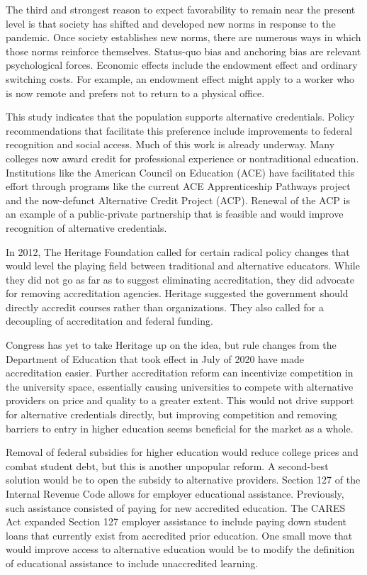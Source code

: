 The third and strongest reason to expect favorability to remain near the present level is that
society has shifted and developed new norms in response to the pandemic.
Once society establishes new norms, there are numerous ways in which those norms reinforce themselves.
Status-quo bias and anchoring bias are relevant psychological forces.
Economic effects include the endowment effect and ordinary switching costs.
For example, an endowment effect might apply to a worker who is now remote and prefers not to return to a physical office.

This study indicates that the population supports alternative credentials.
Policy recommendations that facilitate this preference include improvements to federal recognition and social access.
Much of this work is already underway.
Many colleges now award credit for professional experience or nontraditional education.
Institutions like the American Council on Education (ACE)
have facilitated this effort through programs like the current ACE Apprenticeship Pathways project
and the now-defunct Alternative Credit Project (ACP)\cite{education_2021}.
Renewal of the ACP is an example of a public-private partnership that is feasible and would improve recognition of alternative credentials.

In 2012, The Heritage Foundation called for certain radical policy changes that would level the playing field between traditional and alternative educators.
While they did not go as far as to suggest eliminating accreditation,
they did advocate for removing accreditation agencies.
Heritage suggested the government should directly accredit courses rather than organizations\cite{burke2012accreditation}.
They also called for a decoupling of accreditation and federal funding.

Congress has yet to take Heritage up on the idea,
but rule changes from the Department of Education that took effect in July of 2020
have made accreditation easier\cite{weissman_2019}.
Further accreditation reform can incentivize competition in the university space,
essentially causing universities to compete with alternative providers on price and quality to a greater extent.
This would not drive support for alternative credentials directly,
but improving competition and removing barriers to entry in higher education seems beneficial for the market as a whole.

Removal of federal subsidies for higher education would reduce college prices and combat student debt,
but this is another unpopular reform.
A second-best solution would be to open the subsidy to alternative providers.
Section 127 of the Internal Revenue Code allows for employer educational assistance.
Previously, such assistance consisted of paying for new accredited education.
The CARES Act expanded Section 127 employer assistance
to include paying down student loans that currently exist from accredited prior education\cite{miller_2021}.
One small move that would improve access to alternative education
would be to modify the definition of educational assistance to include unaccredited learning.

